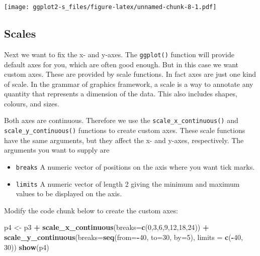 \documentclass[
]{book}
\newenvironment{Shaded}{\begin{snugshade}}{\end{snugshade}}
\newcommand{\AttributeTok}[1]{\textcolor[rgb]{0.13,0.29,0.53}{#1}}
\newcommand{\DecValTok}[1]{\textcolor[rgb]{0.00,0.00,0.81}{#1}}
\newcommand{\FunctionTok}[1]{\textcolor[rgb]{0.13,0.29,0.53}{\textbf{#1}}}
\newcommand{\NormalTok}[1]{#1}
\newcommand{\OtherTok}[1]{\textcolor[rgb]{0.56,0.35,0.01}{#1}}
\newcommand{\SpecialCharTok}[1]{\textcolor[rgb]{0.81,0.36,0.00}{\textbf{#1}}}
\providecommand{\tightlist}{%
  \setlength{\itemsep}{0pt}\setlength{\parskip}{0pt}}
\begin{document}
\texttt{[image: ggplot2-s\_files/figure-latex/unnamed-chunk-8-1.pdf]}

\subsection{Scales}\label{scales}

Next we want to fix the x- and y-axes. The \texttt{ggplot()} function will provide default axes for you, which are often good enough. But in this case we want custom axes. These are provided by scale functions. In fact axes are just one kind of scale. In the grammar of graphics framework, a scale is a way to annotate any quantity that represents a dimension of the data. This also includes shapes, colours, and sizes.

Both axes are continuous. Therefore we use the \texttt{scale\_x\_continuous()} and \texttt{scale\_y\_continuous()} functions to create custom axes. These scale functions have the same arguments, but they affect the x- and y-axes, respectively. The arguments you want to supply are

\begin{itemize}
\tightlist
\item
  \texttt{breaks} A numeric vector of positions on the axis where you want tick marks.
\item
  \texttt{limits} A numeric vector of length 2 giving the minimum and maximum values to be displayed on the axis.
\end{itemize}

Modify the code chunk below to create the custom axes:

\begin{Shaded}
\begin{Highlighting}[]
\NormalTok{p4 }\OtherTok{\textless{}{-}}\NormalTok{ p3 }\SpecialCharTok{+} \FunctionTok{scale\_x\_continuous}\NormalTok{(}\AttributeTok{breaks=}\FunctionTok{c}\NormalTok{(}\DecValTok{0}\NormalTok{,}\DecValTok{3}\NormalTok{,}\DecValTok{6}\NormalTok{,}\DecValTok{9}\NormalTok{,}\DecValTok{12}\NormalTok{,}\DecValTok{18}\NormalTok{,}\DecValTok{24}\NormalTok{)) }\SpecialCharTok{+}
  \FunctionTok{scale\_y\_continuous}\NormalTok{(}\AttributeTok{breaks=}\FunctionTok{seq}\NormalTok{(}\AttributeTok{from=}\SpecialCharTok{{-}}\DecValTok{40}\NormalTok{, }\AttributeTok{to=}\DecValTok{30}\NormalTok{, }\AttributeTok{by=}\DecValTok{5}\NormalTok{),}
                              \AttributeTok{limits =} \FunctionTok{c}\NormalTok{(}\SpecialCharTok{{-}}\DecValTok{40}\NormalTok{, }\DecValTok{30}\NormalTok{))}
\FunctionTok{show}\NormalTok{(p4)}
\end{Highlighting}
\end{Shaded}
\end{document}
